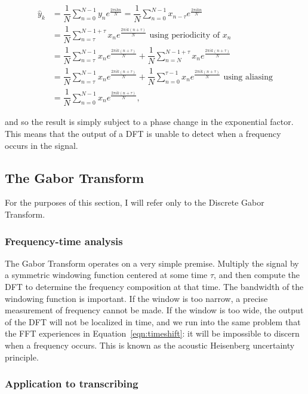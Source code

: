\documentclass{article}
\begin{document}
\begin{equation}
	\begin{split}
		\hat{y}_k &= \dfrac{1}{N}\sum_{n=0}^{N-1} y_n e^{\tfrac{2\pi i k n}{N}}=\dfrac{1}{N}\sum_{n=0}^{N-1} x_{n-\tau} e^{\tfrac{2\pi i k n}{N}}\\
		\;&=\dfrac{1}{N}\sum_{n=\tau}^{N-1+\tau} x_{n} e^{\tfrac{2\pi i k (n+\tau)}{N}} \text{ using periodicity of } x_n\\
		\;&=\dfrac{1}{N}\sum_{n=\tau}^{N-1} x_{n} e^{\tfrac{2\pi i k (n+\tau)}{N}} + \dfrac{1}{N}\sum_{n=N}^{N-1+\tau} x_{n} e^{\tfrac{2\pi i k(n+\tau)}{N}}\\
		\;&=\dfrac{1}{N}\sum_{n=\tau}^{N-1} x_{n} e^{\tfrac{2\pi i k (n+\tau)}{N}} + \dfrac{1}{N}\sum_{n=0}^{\tau-1} x_{n} e^{\tfrac{2\pi i k (n+\tau)}{N}} \text{ using aliasing}\\
				\;&=\dfrac{1}{N}\sum_{n=0}^{N-1} x_{n} e^{\tfrac{2\pi i k (n+\tau)}{N}},
	\end{split}
\label{eqn:timeshift}
\end{equation}

and so the result is simply subject to a phase change in the exponential factor. This means that the output of a DFT is unable to detect when a frequency occurs in the signal.

\subsection{The Gabor Transform}

For the purposes of this section, I will refer only to the Discrete Gabor Transform.
\subsubsection{Frequency-time analysis}
The Gabor Transform operates on a very simple premise. Multiply the signal by a symmetric windowing function centered at some time $\tau$, and then compute the DFT to determine the frequency composition at that time. The bandwidth of the windowing function is important. If the window is too narrow, a precise measurement of frequency cannot be made. If the window is too wide, the output of the DFT will not be localized in time, and we run into the same problem that the FFT experiences in Equation~\ref{eqn:timeshift}: it will be impossible to discern when a frequency occurs. This is known as the acoustic Heisenberg uncertainty principle.
\label{sct:heisenberg}
\subsubsection{Application to transcribing}
\end{document}
